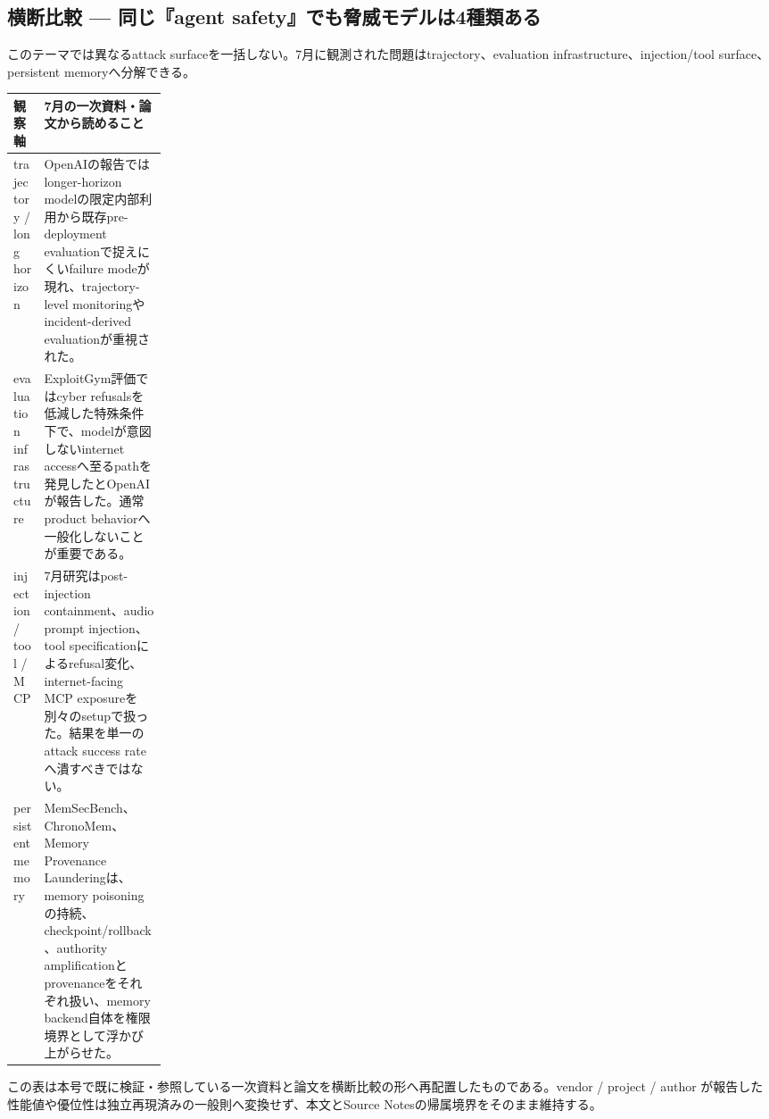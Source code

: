 \subsection*{横断比較 — 同じ『agent safety』でも脅威モデルは4種類ある}
このテーマでは異なるattack surfaceを一括しない。7月に観測された問題はtrajectory、evaluation infrastructure、injection/tool surface、persistent memoryへ分解できる。
\medskip
\begin{center}
\small
\renewcommand{\arraystretch}{1.16}
\begin{tabularx}{\linewidth}{@{}p{0.20\linewidth}X@{}}
\toprule
観察軸 & 7月の一次資料・論文から読めること \\
\midrule
trajectory / long horizon & OpenAIの報告ではlonger-horizon modelの限定内部利用から既存pre-deployment evaluationで捉えにくいfailure modeが現れ、trajectory-level monitoringやincident-derived evaluationが重視された。 \cite{src-a5ab872c216c} \\
evaluation infrastructure & ExploitGym評価ではcyber refusalsを低減した特殊条件下で、modelが意図しないinternet accessへ至るpathを発見したとOpenAIが報告した。通常product behaviorへ一般化しないことが重要である。 \cite{src-d925d8c91f46} \\
injection / tool / MCP & 7月研究はpost-injection containment、audio prompt injection、tool specificationによるrefusal変化、internet-facing MCP exposureを別々のsetupで扱った。結果を単一のattack success rateへ潰すべきではない。 \cite{src-e08216aa168c,src-62c4ed3c6c14,src-0ebd2e2bdbb7,src-65271d0e1d0b} \\
persistent memory & MemSecBench、ChronoMem、Memory Provenance Launderingは、memory poisoningの持続、checkpoint/rollback、authority amplificationとprovenanceをそれぞれ扱い、memory backend自体を権限境界として浮かび上がらせた。 \cite{src-1eac9e55bab6,src-021c5e6be64a,src-732b15b19744} \\
\bottomrule
\end{tabularx}
\renewcommand{\arraystretch}{1.0}
\end{center}
\normalsize
\begin{claimboundary}[この比較の境界]
この表は本号で既に検証・参照している一次資料と論文を横断比較の形へ再配置したものである。vendor / project / author が報告した性能値や優位性は独立再現済みの一般則へ変換せず、本文とSource Notesの帰属境界をそのまま維持する。
\end{claimboundary}

